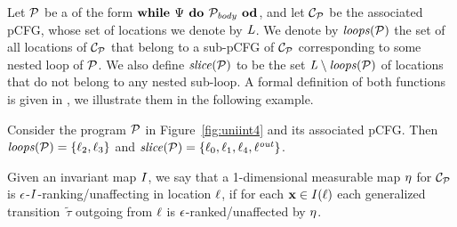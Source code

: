 Let $\mathcal{P}$ be a \PP{} of the form $\textbf{while } \Psi \textbf{ do } 
\mathcal{P}_{\mathit{body}} \textbf{ od}$, and let $\mathcal{C}_{\mathcal{P}}$ be the associated pCFG, whose set of locations we denote by $\mathit{L}$. We denote by $\mathit{loops}(\mathcal{P})$ the set of all locations of $\mathcal{C}_{\mathcal{P}}$ that belong to a sub-pCFG of $\mathcal{C}_{\mathcal{P}}$ corresponding to some nested loop of $\mathcal{P}$. We also define $\mathit{slice}(\mathcal{P})$ to be the set $\mathit{L}\setminus\mathit{loops}(\mathcal{P})$ of locations that do not belong to any nested sub-loop.  A formal definition of 
both functions is given in \AppendixMaterial, we illustrate them in the 
following example.

\begin{example}
Consider the program $\mathcal{P}$ in Figure~\ref{fig:uniint4} and its associated 
pCFG. Then $\mathit{loops}(\mathcal{P})=\{\ell_2,\ell_3\}$ and 
$\mathit{slice}(\mathcal{P})=\{\ell_0,\ell_1,\ell_4,\ell^{\mathit{out}}\}$.
\end{example}

Given an invariant map $I$, we say that a 1-dimensional measurable map 
$\eta$ for $\mathcal{C}_{\mathcal{P}}$ is $\epsilon$-$I$-ranking/unaffecting in location $\ell$, if 
for each $\mathbf{x}\in I(\ell)$  each generalized transition~$\tilde{\tau}$ 
outgoing from $\ell$ is $\epsilon$-ranked/unaffected by $\eta$. 

